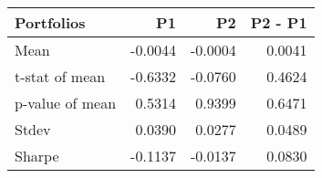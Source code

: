 \begin{tabular}{lrrr}
\toprule
Portfolios & P1 & P2 & P2 - P1 \\
\midrule
Mean & -0.0044 & -0.0004 & 0.0041 \\
t-stat of mean & -0.6332 & -0.0760 & 0.4624 \\
p-value of mean & 0.5314 & 0.9399 & 0.6471 \\
Stdev & 0.0390 & 0.0277 & 0.0489 \\
Sharpe & -0.1137 & -0.0137 & 0.0830 \\
\bottomrule
\end{tabular}
